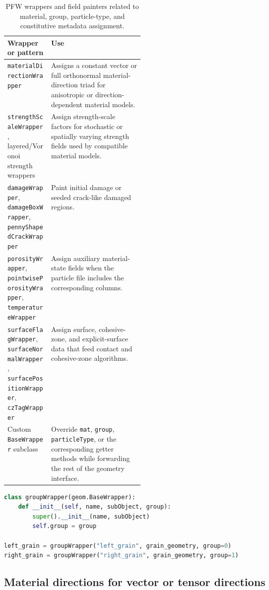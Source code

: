 \begin{table}[htbp]
\centering
\caption{PFW wrappers and field painters related to material, group, particle-type, and constitutive metadata assignment.}
\label{tab:pfw-assignment-wrapper-list}
\small
\begin{tabularx}{\linewidth}{@{}p{0.32\linewidth}X@{}}
\toprule
\textbf{Wrapper or pattern} & \textbf{Use}\\
\midrule
\texttt{materialDirectionWrapper} & Assigns a constant vector or full orthonormal material-direction triad for anisotropic or direction-dependent material models.\\
\texttt{strengthScaleWrapper}, layered/Voronoi strength wrappers & Assign strength-scale factors for stochastic or spatially varying strength fields used by compatible material models.\\
\texttt{damageWrapper}, \texttt{damageBoxWrapper}, \texttt{pennyShapedCrackWrapper} & Paint initial damage or seeded crack-like damaged regions.\\
\texttt{porosityWrapper}, \texttt{pointwisePorosityWrapper}, \texttt{temperatureWrapper} & Assign auxiliary material-state fields when the particle file includes the corresponding columns.\\
\texttt{surfaceFlagWrapper}, \texttt{surfaceNormalWrapper}, \texttt{surfacePositionWrapper}, \texttt{czTagWrapper} & Assign surface, cohesive-zone, and explicit-surface data that feed contact and cohesive-zone algorithms.\\
Custom \texttt{BaseWrapper} subclass & Override \texttt{mat}, \texttt{group}, \texttt{particleType}, or the corresponding getter methods while forwarding the rest of the geometry interface.\\
\bottomrule
\end{tabularx}
\end{table}

\begin{lstlisting}[language=Python,caption={Minimal custom wrapper that changes contact group while reusing a geometry.}]
class groupWrapper(geom.BaseWrapper):
    def __init__(self, name, subObject, group):
        super().__init__(name, subObject)
        self.group = group

left_grain = groupWrapper("left_grain", grain_geometry, group=0)
right_grain = groupWrapper("right_grain", grain_geometry, group=1)
\end{lstlisting}

\subsection{Material directions for vector or tensor directions}
\label{subsec:pfw-material-directions}

